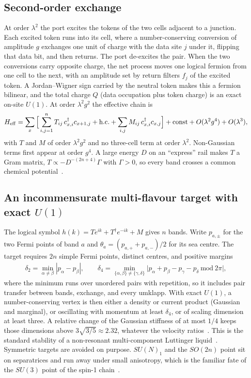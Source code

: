 \documentclass[11pt]{article}
\theoremstyle{definition}
\begin{document}
\subsection{Second-order exchange}

At order $\lambda^2$ the port excites the tokens of the two cells adjacent to a junction. Each excited token runs into its cell, where a number-conserving conversion of amplitude $g$ exchanges one unit of charge with the data site $j$ under it, flipping that data bit, and then returns. The port de-excites the pair. When the two conversions carry opposite charge, the net process moves one logical fermion from one cell to the next, with an amplitude set by return filters $f_j$ of the excited token. A Jordan--Wigner sign carried by the neutral token makes this a fermion bilinear, and the total charge $Q$ (data occupation plus token charge) is an exact on-site $U(1)$. At order $\lambda^2g^2$ the effective chain is
\begin{align}
H_{\rm eff}=\sum_x\Big[\sum_{i,j=1}^{n}T_{ij}\,c^\dagger_{x,i}c_{x+1,j}+\text{h.c.}+\sum_{i,j}M_{ij}\,c^\dagger_{x,i}c_{x,j}\Big]+\text{const}+O(\lambda^2g^4)+O(\lambda^3),
\label{eq:Heff}
\end{align}
with $T$ and $M$ of order $\lambda^2g^2$ and no three-cell term at order $\lambda^2$. Non-Gaussian terms first appear at order $g^4$. A large energy $D$ on an ``express'' rail makes $T$ a Gram matrix, $T\propto -D^{-(2n+4)}\Gamma$ with $\Gamma>0$, so every band crosses a common chemical potential~\cite{C39}.

\subsection{An incommensurate multi-flavour target with exact \texorpdfstring{$U(1)$}{U(1)}}

The logical symbol $h(k)=Te^{ik}+T^\dagger e^{-ik}+M$ gives $n$ bands. Write $p_{a,\pm}$ for the two Fermi points of band $a$ and $\theta_a=(p_{a,+}+p_{a,-})/2$ for its sea centre. The target requires $2n$ simple Fermi points, distinct centres, and positive margins
\begin{align}
\delta_2=\min_{\alpha\neq\beta}|p_\alpha-p_\beta|,\qquad
\delta_4=\min_{\{\alpha,\beta\}\neq\{\gamma,\delta\}}\big|p_\alpha+p_\beta-p_\gamma-p_\delta\ \mathrm{mod}\ 2\pi\big|,
\label{eq:margins}
\end{align}
where the minimum runs over unordered pairs with repetition, so it includes pair transfer between bands, exchange, and every umklapp. With exact $U(1)$, a number-conserving vertex is then either a density or current product (Gaussian and marginal), or oscillating with momentum at least $\delta_4$, or of scaling dimension at least three. A relative change of the Gaussian stiffness of at most $1/4$ keeps those dimensions above $3\sqrt{3/5}\approx2.32$, whatever the velocity ratios~\cite{C45}. This is the standard stability of a non-resonant multi-component Luttinger liquid~\cite{BFM,MP}. Symmetric targets are avoided on purpose. $SU(N)_1$ and the $SO(2n)$ point sit on separatrices and run away under small anisotropy, which is the familiar fate of the $SU(3)$ point of the spin-1 chain~\cite{ItoiKato}.
\end{document}
